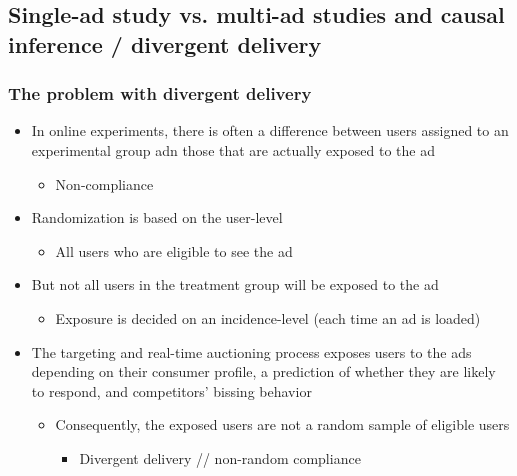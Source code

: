 \documentclass[10pt]{article}
\begin{document}
\subsection{Single-ad study vs. multi-ad studies and causal inference / divergent delivery}
\subsubsection{The problem with divergent delivery}
\begin{itemize}
    \item In online experiments, there is often a difference between users assigned to an experimental group adn those that are actually exposed to the ad 
    \begin{itemize}
        \item Non-compliance
    \end{itemize}
    \item Randomization is based on the user-level 
    \begin{itemize}
        \item All users who are eligible to see the ad 
    \end{itemize}
    \item But not all users in the treatment group will be exposed to the ad 
    \begin{itemize}
        \item Exposure is decided on an incidence-level (each time an ad is loaded)
    \end{itemize}
    \item The targeting and real-time auctioning process exposes users to the ads depending on their consumer profile, a prediction of whether they are likely to respond, and competitors' bissing behavior 
    \begin{itemize}
        \item Consequently, the exposed users are not a random sample of eligible users 
        \begin{itemize}
            \item Divergent delivery // non-random compliance
        \end{itemize}
    \end{itemize}
\end{itemize}
\end{document}
